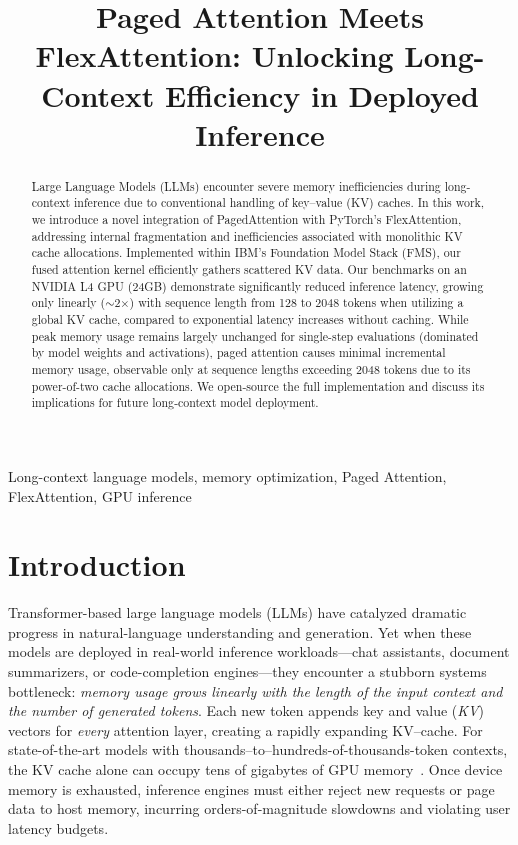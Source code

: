 \documentclass[conference]{IEEEtran}
\title{Paged Attention Meets FlexAttention: Unlocking Long-Context Efficiency in Deployed Inference}
\author{
\IEEEauthorblockN{Thomas Joshi, Herman Saini, Neil Dhillon}
\IEEEauthorblockA{\textit{Columbia University} \\
Email: \{ttj2108, hss2173, nsd2147\}@columbia.edu}
}
\begin{document}
\maketitle

\begin{abstract}
Large Language Models (LLMs) encounter severe memory inefficiencies during long-context inference due to conventional handling of key–value (KV) caches. In this work, we introduce a novel integration of PagedAttention with PyTorch's FlexAttention, addressing internal fragmentation and inefficiencies associated with monolithic KV cache allocations. Implemented within IBM's Foundation Model Stack (FMS), our fused attention kernel efficiently gathers scattered KV data. Our benchmarks on an NVIDIA L4 GPU (24GB) demonstrate significantly reduced inference latency, growing only linearly ($\sim$2$\times$) with sequence length from 128 to 2048 tokens when utilizing a global KV cache, compared to exponential latency increases without caching. While peak memory usage remains largely unchanged for single-step evaluations (dominated by model weights and activations), paged attention causes minimal incremental memory usage, observable only at sequence lengths exceeding 2048 tokens due to its power-of-two cache allocations. We open‑source the full implementation and discuss its implications for future long‑context model deployment.
\end{abstract}

\begin{IEEEkeywords}
Long-context language models, memory optimization, Paged Attention, FlexAttention, GPU inference
\end{IEEEkeywords}

\section{Introduction}\label{sec:intro}

Transformer-based large language models (LLMs) have catalyzed dramatic progress in natural-language understanding and generation.  Yet when these models are deployed in real-world inference workloads—chat assistants, document summarizers, or code-completion engines—they encounter a stubborn systems bottleneck: \emph{memory usage grows linearly with the length of the input context and the number of generated tokens}.  Each new token appends key and value (\textit{KV}) vectors for \emph{every} attention layer, creating a rapidly expanding KV--cache.  For state-of-the-art models with thousands–to–hundreds-of-thousands-token contexts, the KV cache alone can occupy tens of gigabytes of GPU memory~\cite{dao2022flashattention,kwon2023pagedattention}.  Once device memory is exhausted, inference engines must either reject new requests or page data to host memory, incurring orders-of-magnitude slowdowns and violating user latency budgets.
\end{document}
